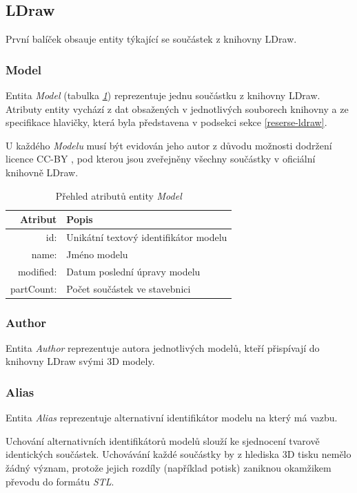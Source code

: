 \subsection{LDraw}
První balíček obsauje entity týkající se součástek z knihovny LDraw.

\subsubsection*{Model}
  Entita \textit{Model} (tabulka \emph{\ref{table:entity:model}}) reprezentuje jednu součástku z knihovny LDraw. Atributy entity vychází z dat obsažených v jednotlivých souborech knihovny a ze specifikace hlavičky, která byla představena v podsekci \emph{} sekce \ref{reserse-ldraw}.
    
  U každého \textit{Modelu} musí být evidován jeho autor z důvodu možnosti dodržení licence \gls{CC-BY} \cite{CC-BY}, pod kterou jsou zveřejněny všechny součástky v oficiální knihovně LDraw. 
  
  \begin{table}[th!]
  \centering
  \caption{Přehled atributů entity \textit{Model}}
  \label{table:entity:model}
  \begin{tabularx}{\textwidth}{@{}rX@{}}
  \toprule
  Atribut & Popis
  \\ \midrule
  id: & Unikátní textový identifikátor modelu
  \\
  name: & Jméno modelu 
  \\
  modified: & Datum poslední úpravy modelu 
  \\
  partCount: & Počet součástek ve stavebnici
  \\
  \bottomrule
  \end{tabularx}
  \end{table}

\subsubsection*{Author}
Entita \textit{Author} reprezentuje autora jednotlivých modelů, kteří přispívají do knihovny LDraw svými 3D modely. 
  
\subsubsection*{Alias}
Entita \textit{Alias} reprezentuje alternativní identifikátor modelu na který má vazbu. 

Uchování alternativních identifikátorů modelů slouží ke sjednocení tvarově identických součástek. Uchovávání každé součástky by z hlediska 3D tisku nemělo žádný význam, protože jejich rozdíly (například potisk) zaniknou okamžikem převodu do formátu \textit{STL}.

